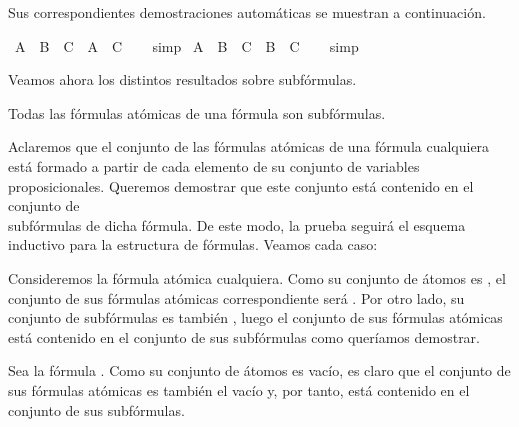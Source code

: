 \begin{isabellebody}
{\isafoldproof}%
%
\isadelimproof
%
\endisadelimproof
%
\begin{isamarkuptext}%
Sus correspondientes demostraciones automáticas se muestran a 
  continuación.%
\end{isamarkuptext}\isamarkuptrue%
\isamarkupfalse%
\ {\isachardoublequoteopen}A\ {\isasymunion}\ B\ {\isasymsubseteq}\ C\ {\isasymLongrightarrow}\ A\ {\isasymsubseteq}\ C{\isachardoublequoteclose}\isanewline
%
\isadelimproof
\ \ %
\endisadelimproof
%
\isatagproof
{}\isamarkupfalse%
\ simp%
\endisatagproof
{\isafoldproof}%
%
\isadelimproof
\isanewline
%
\endisadelimproof
\isanewline
{}\isamarkupfalse%
\ {\isachardoublequoteopen}A\ {\isasymunion}\ B\ {\isasymsubseteq}\ C\ {\isasymLongrightarrow}\ B\ {\isasymsubseteq}\ C{\isachardoublequoteclose}\isanewline
%
\isadelimproof
\ \ %
\endisadelimproof
%
\isatagproof
{}\isamarkupfalse%
\ simp%
\endisatagproof
{\isafoldproof}%
%
\isadelimproof
%
\endisadelimproof
%
\begin{isamarkuptext}%
Veamos ahora los distintos resultados sobre subfórmulas.

  \begin{lema}
    Todas las fórmulas atómicas de una fórmula son subfórmulas.
  \end{lema}

  \begin{demostracion}
    Aclaremos que el conjunto de las fórmulas atómicas de una fórmula 
    cualquiera está formado a partir de cada elemento de su conjunto de 
    variables proposicionales. 
    Queremos demostrar que este conjunto está contenido en el conjunto 
    de\\ subfórmulas de dicha fórmula.
    De este modo, la prueba seguirá el esquema inductivo para la 
    estructura de fórmulas. Veamos cada caso:
  
    Consideremos la fórmula atómica  cualquiera. Como su
    conjunto de átomos es , el conjunto de sus fórmulas atómicas
    correspondiente será . Por otro lado, su conjunto de
    subfórmulas es también , luego el conjunto de sus fórmulas 
    atómicas está contenido en el conjunto de sus subfórmulas como 
    queríamos demostrar.

    Sea la fórmula \isa{{\isasymbottom}}. Como su conjunto de átomos es vacío, es claro 
    que el conjunto de sus fórmulas atómicas es también el vacío y, por
    tanto, está contenido en el conjunto de sus subfórmulas.


\end{demostracion}
\end{isamarkuptext}
\end{isabellebody}
